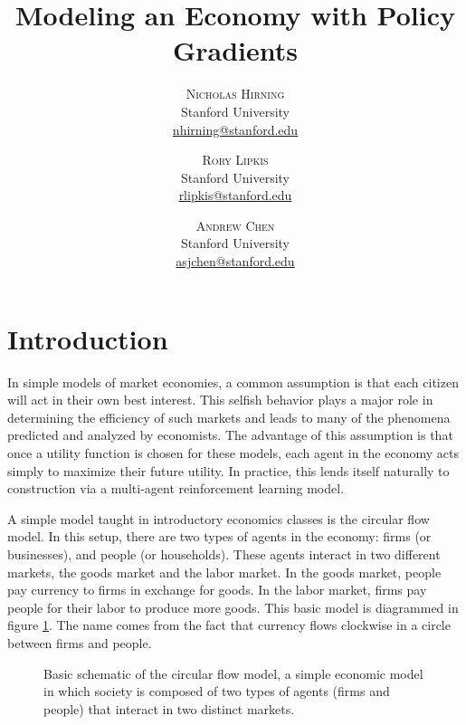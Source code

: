 \documentclass[twoside,twocolumn]{article}
\title{Modeling an Economy with Policy Gradients} %
\author{%
\textsc{Nicholas Hirning} \\[1ex]
\normalsize Stanford University \\ 
\normalsize \href{mailto:nhirning@stanford.edu}{nhirning@stanford.edu}
\and
\textsc{Rory Lipkis} \\[1ex]
\normalsize Stanford University \\ 
\normalsize \href{mailto:rlipkis@stanford.edu}{rlipkis@stanford.edu}
\and
\textsc{Andrew Chen} \\[1ex]
\normalsize Stanford University \\ 
\normalsize \href{mailto:asjchen@stanford.edu}{asjchen@stanford.edu}
}
\date{} %
\begin{document}
\maketitle


\section{Introduction}

In simple models of market economies, a common assumption is that each citizen will act in their own best interest. This selfish behavior plays a major role in determining the efficiency of such markets and leads to many of the phenomena predicted and analyzed by economists. The advantage of this assumption is that once a utility function is chosen for these models, each agent in the economy acts simply to maximize their future utility. In practice, this lends itself naturally to construction via a multi-agent reinforcement learning model. 

\medskip

A simple model taught in introductory economics classes is the circular flow model. In this setup, there are two types of agents in the economy: firms (or businesses), and people (or households). These agents interact in two different markets, the goods market and the labor market. In the goods market, people pay currency to firms in exchange for goods. In the labor market, firms pay people for their labor to produce more goods. This basic model is diagrammed in figure \ref{fig:circularflow}. The name comes from the fact that currency flows clockwise in a circle between firms and people.

\begin{figure}[h]
  \centering
  \caption{Basic schematic of the circular flow model, a simple economic model in which society is composed of two types of agents (firms and people) that interact in two distinct markets.} \label{fig:circularflow}
\end{figure}
\end{document}
